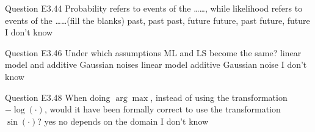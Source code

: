 \begin{frame}{Question E3.44}
	\QuestionNotes{}
	\QuestionBody
	{
		Probability refers to events of the \ldots\ldots, while likelihood refers to events of the \ldots\ldots (fill the blanks)
	}
	\QuestionAnswers
	{
		\answer past, past
		\answer past, future
		\correctanswer future, past
		\answer future, future
		\answer I don't know
	}
\end{frame}


\begin{frame}{Question E3.46}
	\QuestionNotes{}
	\QuestionBody
	{
		Under which assumptions ML and LS become the same?
	}
	\QuestionAnswers
	{
		\answer linear model and additive Gaussian noises
		\answer linear model
		\correctanswer additive Gaussian noise
		\answer I don't know
	}
\end{frame}


\begin{frame}{Question E3.48}
	\QuestionNotes{}
	\QuestionBody
	{
		When doing $\arg \max$, instead of using the transformation $- \log( \cdot )$, would it have been formally correct to use the transformation $\sin ( \cdot )$?
	}
	\QuestionAnswers
	{
		\answer yes
		\answer no
		\correctanswer depends on the domain
		\answer I don't know
	}
\end{frame}




